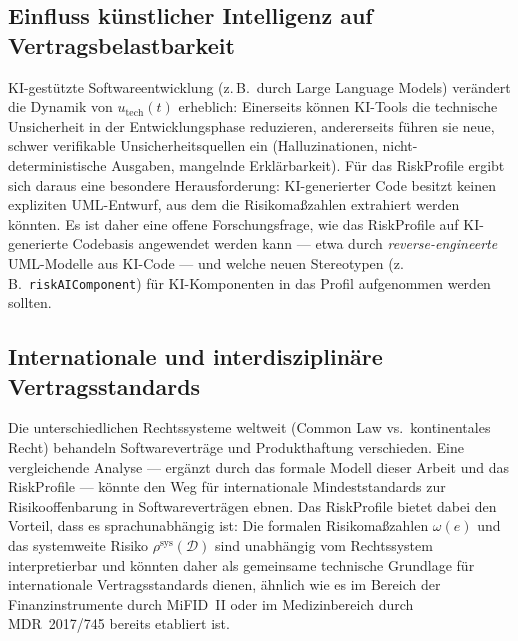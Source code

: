 ﻿\documentclass[a4paper,12pt]{article}
\theoremstyle{definition}
\begin{document}
\subsection{Einfluss k\"unstlicher Intelligenz auf Vertragsbelastbarkeit}

KI-gest\"utzte Softwareentwicklung (z.\,B.\ durch Large Language Models) ver\"andert die
Dynamik von $u_{\mathrm{tech}}(t)$ erheblich: Einerseits k\"onnen KI-Tools die technische
Unsicherheit in der Entwicklungsphase reduzieren, andererseits f\"uhren sie neue, schwer
verifikable Unsicherheitsquellen ein (Halluzinationen, nicht-deterministische Ausgaben,
mangelnde Erkl\"arbarkeit). F\"ur das \textsf{RiskProfile} ergibt sich daraus eine
besondere Herausforderung: KI-generierter Code besitzt keinen expliziten UML-Entwurf,
aus dem die Risikoma\ss{}zahlen extrahiert werden k\"onnten. Es ist daher eine offene
Forschungsfrage, wie das \textsf{RiskProfile} auf KI-generierte Codebasis angewendet
werden kann --- etwa durch \emph{reverse-engineerte} UML-Modelle aus KI-Code --- und
welche neuen Stereotypen (z.\,B.\ \texttt{\guillemotleft{}riskAIComponent\guillemotright{}})
f\"ur KI-Komponenten in das Profil aufgenommen werden sollten.

\subsection{Internationale und interdisziplin\"are Vertragsstandards}

Die unterschiedlichen Rechtssysteme weltweit (Common Law vs.\ kontinentales Recht)
behandeln Softwarevertr\"age und Produkthaftung verschieden. Eine vergleichende Analyse
--- erg\"anzt durch das formale Modell dieser Arbeit und das \textsf{RiskProfile} ---
k\"onnte den Weg f\"ur internationale Mindeststandards zur Risikooffenbarung in
Softwarevertr\"agen ebnen. Das \textsf{RiskProfile} bietet dabei den Vorteil, dass es
sprachunabh\"angig ist: Die formalen Risikoma\ss{}zahlen $\omega(e)$ und das
systemweite Risiko $\rho^{\mathrm{sys}}(\mathcal{D})$ sind unabh\"angig vom
Rechtssystem interpretierbar und k\"onnten daher als gemeinsame technische Grundlage
f\"ur internationale Vertragsstandards dienen, \"ahnlich wie es im Bereich der
Finanzinstrumente durch MiFID~II oder im Medizinbereich durch MDR~2017/745 bereits
etabliert ist.
\end{document}
